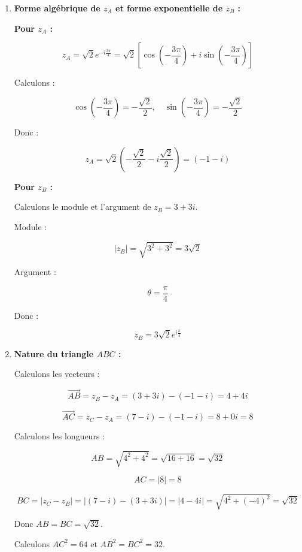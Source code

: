\documentclass[a4paper,12pt]{article}
\begin{document}
\begin{solutionbox}
\begin{enumerate}
    \item \textbf{Forme algébrique de \( z_A \) et forme exponentielle de \( z_B \) :}

    \textbf{Pour \( z_A \) :}

    \[
    z_A = \sqrt{2} e^{-i\frac{3\pi}{4}} = \sqrt{2} \left[ \cos\left( -\dfrac{3\pi}{4} \right) + i \sin\left( -\dfrac{3\pi}{4} \right) \right]
    \]

    Calculons :

    \[
    \cos\left( -\dfrac{3\pi}{4} \right) = -\dfrac{\sqrt{2}}{2}, \quad \sin\left( -\dfrac{3\pi}{4} \right) = -\dfrac{\sqrt{2}}{2}
    \]

    Donc :

    \[
    z_A = \sqrt{2} \left( -\dfrac{\sqrt{2}}{2} - i \dfrac{\sqrt{2}}{2} \right) = (-1 - i)
    \]

    \textbf{Pour \( z_B \) :}

    Calculons le module et l'argument de \( z_B = 3 + 3i \).

    Module :

    \[
    |z_B| = \sqrt{3^2 + 3^2} = 3\sqrt{2}
    \]

    Argument :

    \[
    \theta = \dfrac{\pi}{4}
    \]

    Donc :

    \[
    z_B = 3\sqrt{2} e^{i\frac{\pi}{4}}
    \]

    \item \textbf{Nature du triangle \( ABC \) :}

    Calculons les vecteurs :

    \[
    \overrightarrow{AB} = z_B - z_A = (3 + 3i) - (-1 - i) = 4 + 4i
    \]

    \[
    \overrightarrow{AC} = z_C - z_A = (7 - i) - (-1 - i) = 8 + 0i = 8
    \]

    Calculons les longueurs :

    \[
    AB = \sqrt{4^2 + 4^2} = \sqrt{16 + 16} = \sqrt{32}
    \]

    \[
    AC = |8| = 8
    \]

    \[
    BC = |z_C - z_B| = |(7 - i) - (3 + 3i)| = |4 - 4i| = \sqrt{4^2 + (-4)^2} = \sqrt{32}
    \]

    Donc \( AB = BC = \sqrt{32} \).

    Calculons \( AC^2 = 64 \) et \( AB^2 = BC^2 = 32 \).


\end{enumerate}
\end{solutionbox}
\end{document}
